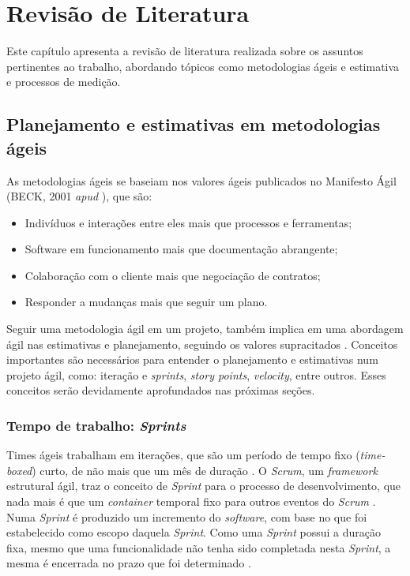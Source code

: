\chapter{Revisão de Literatura}
  
  Este capítulo apresenta a revisão de literatura realizada sobre os assuntos pertinentes ao trabalho, abordando
  tópicos como metodologias ágeis e estimativa e processos de medição.
  
\section{Planejamento e estimativas em metodologias ágeis}

  As metodologias ágeis se baseiam nos valores ágeis publicados no Manifesto Ágil
  (BECK, 2001 \textit{apud} ), que são:

  \begin{itemize}
   \item Indivíduos e interações entre eles mais que processos e ferramentas;
   \item Software em funcionamento mais que documentação abrangente;
   \item Colaboração com o cliente mais que negociação de contratos;
   \item Responder a mudanças mais que seguir um plano.
  \end{itemize}

 Seguir uma metodologia ágil em um projeto, também implica em uma abordagem ágil nas estimativas e planejamento, seguindo
 os valores supracitados \cite{cohn06}. Conceitos importantes são necessários para entender o planejamento e estimativas
 num projeto ágil, como: iteração e \textit{sprints}, \textit{story points}, \textit{velocity}, entre outros.
 Esses conceitos serão devidamente aprofundados nas próximas seções.

  \subsection{Tempo de trabalho: \textit{Sprints}}

    Times ágeis trabalham em iterações, que são um período de tempo fixo (\textit{time-boxed}) curto, de não mais que
    um mês de duração \cite{cohn06} \cite{scrum13}. O \textit{Scrum}, um \textit{framework} estrutural ágil,
    traz o conceito de \textit{Sprint} para o processo de desenvolvimento, que nada mais é que um \textit{container}
    temporal fixo para outros eventos do \textit{Scrum} \cite{scrum13}. Numa \textit{Sprint} é produzido um incremento
    do \textit{software}, com base no que foi estabelecido como escopo daquela \textit{Sprint}. Como uma \textit{Sprint} possui
    a duração fixa, mesmo que uma funcionalidade não tenha sido completada nesta \textit{Sprint}, a mesma é encerrada no prazo
    que foi determinado \cite{cohn06}.

